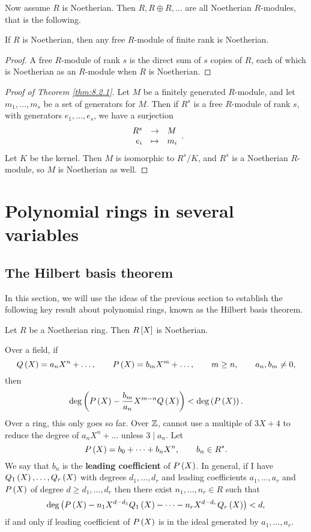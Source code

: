 Now assume $ R $ is Noetherian. Then $ R, R \oplus R, \dots $ are all Noetherian $ R $-modules, that is the following.

\begin{corollary}
If $ R $ is Noetherian, then any free $ R $-module of finite rank is Noetherian.
\end{corollary}

\begin{proof}
A free $ R $-module of rank $ s $ is the direct sum of $ s $ copies of $ R $, each of which is Noetherian as an $ R $-module when $ R $ is Noetherian.
\end{proof}

\begin{proof}[Proof of Theorem \ref{thm:8.2.1}]
Let $ M $ be a finitely generated $ R $-module, and let $ m_1, \dots, m_s $ be a set of generators for $ M $. Then if $ R^s $ is a free $ R $-module of rank $ s $, with generators $ e_1, \dots, e_s $, we have a surjection
$$ \function{R^s}{M}{e_i}{m_i}. $$
Let $ K $ be the kernel. Then $ M $ is isomorphic to $ R^s / K $, and $ R^s $ is a Noetherian $ R $-module, so $ M $ is Noetherian as well.
\end{proof}

\pagebreak

\section{Polynomial rings in several variables}

\subsection{The Hilbert basis theorem}

In this section, we will use the ideas of the previous section to establish the following key result about polynomial rings, known as the Hilbert basis theorem.

\begin{theorem}
\label{thm:9.1.1}
Let $ R $ be a Noetherian ring. Then $ R\sb{X} $ is Noetherian.
\end{theorem}


Over a field, if
$$ Q\rb{X} = a_nX^n + \dots, \qquad P\rb{X} = b_mX^m + \dots, \qquad m \ge n, \qquad a_n, b_m \ne 0, $$
then
$$ \deg\rb{P\rb{X} - \dfrac{b_m}{a_n}X^{m - n}Q\rb{X}} < \deg\rb{P\rb{X}}. $$
Over a ring, this only goes so far. Over $ \Z $, cannot use a multiple of $ 3X + 4 $ to reduce the degree of $ a_nX^n + \dots $ unless $ 3 \mid a_n $. Let
$$ P\rb{X} = b_0 + \dots + b_nX^n, \qquad b_n \in R^*. $$
We say that $ b_n $ is the \textbf{leading coefficient} of $ P\rb{X} $. In general, if I have $ Q_1\rb{X}, \dots, Q_r\rb{X} $ with degrees $ d_1, \dots, d_r $ and leading coefficients $ a_1, \dots, a_r $ and $ P\rb{X} $ of degree $ d \ge d_1, \dots, d_r $ then there exist $ n_1, \dots, n_r \in R $ such that
$$ \deg\rb{P\rb{X} - n_1X^{d - d_1}Q_1\rb{X} - \dots - n_rX^{d - d_r}Q_r\rb{X}} < d, $$
if and only if leading coefficient of $ P\rb{X} $ is in the ideal generated by $ a_1, \dots, a_r $. 

